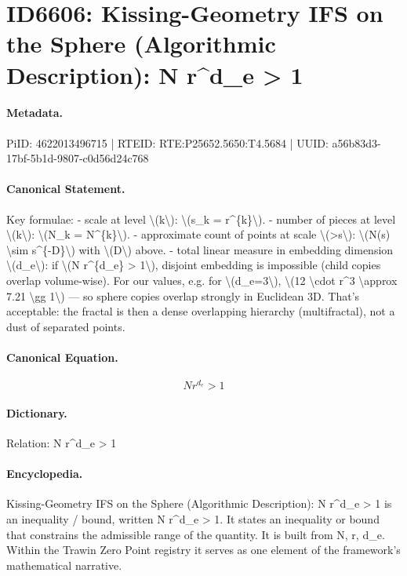 \section*{ID6606: Kissing-Geometry IFS on the Sphere (Algorithmic Description): N r\textasciicircum{}d\_e > 1}
\paragraph{Metadata.}
PiID: 4622013496715 | RTEID: RTE:P25652.5650:T4.5684 | UUID: a56b83d3-17bf-5b1d-9807-c0d56d24c768

\paragraph{Canonical Statement.}
Key formulae: - scale at level \textbackslash{}(k\textbackslash{}): \textbackslash{}(s\_k = r\textasciicircum{}\{k\}\textbackslash{}). - number of pieces at level \textbackslash{}(k\textbackslash{}): \textbackslash{}(N\_k = N\textasciicircum{}\{k\}\textbackslash{}). - approximate count of points at scale \textbackslash{}(>s\textbackslash{}): \textbackslash{}(N(s) \textbackslash{}sim s\textasciicircum{}\{-D\}\textbackslash{}) with \textbackslash{}(D\textbackslash{}) above. - total linear measure in embedding dimension \textbackslash{}(d\_e\textbackslash{}): if \textbackslash{}(N r\textasciicircum{}\{d\_e\} > 1\textbackslash{}), disjoint embedding is impossible (child copies overlap volume-wise). For our values, e.g. for \textbackslash{}(d\_e=3\textbackslash{}), \textbackslash{}(12 \textbackslash{}cdot r\textasciicircum{}3 \textbackslash{}approx 7.21 \textbackslash{}gg 1\textbackslash{}) — so sphere copies overlap strongly in Euclidean 3D. That’s acceptable: the fractal is then a dense overlapping hierarchy (multifractal), not a dust of separated points.

\paragraph{Canonical Equation.}
\[
N r^{d_e} > 1
\]

\paragraph{Dictionary.}
Relation: N r\textasciicircum{}d\_e > 1

\paragraph{Encyclopedia.}
Kissing-Geometry IFS on the Sphere (Algorithmic Description): N r\textasciicircum{}d\_e > 1 is an inequality / bound, written N r\textasciicircum{}d\_e > 1. It states an inequality or bound that constrains the admissible range of the quantity. It is built from N, r, d\_e. Within the Trawin Zero Point registry it serves as one element of the framework's mathematical narrative.
